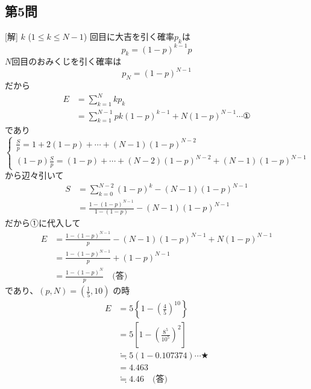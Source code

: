 \documentclass[../main.tex]{subfiles}
\begin{document}
\begin{center}
\end{center}

\subsection*{第5問}
[解] $k$ ($1 \le k \le N-1$) 回目に大吉を引く確率$p_k$は
\[ p_k = (1-p)^{k-1}p \]
$N$回目のおみくじを引く確率は
\[ p_N = (1-p)^{N-1} \]
だから
\begin{align*}
  E &= \sum_{k=1}^N k p_k \\
  &= \sum_{k=1}^{N-1} pk(1-p)^{k-1} + N(1-p)^{N-1} \cdots \text{①}
\end{align*}
であり
\[
  \begin{cases} \frac{S}{p} = 1 + 2(1-p) + \cdots + (N-1)(1-p)^{N-2} \\ (1-p)\frac{S}{p} = (1-p) + \cdots + (N-2)(1-p)^{N-2} + (N-1)(1-p)^{N-1}
\end{cases} \]
から辺々引いて
\begin{align*}
  S &= \sum_{k=0}^{N-2} (1-p)^k - (N-1)(1-p)^{N-1} \\
  &= \frac{1-(1-p)^{N-1}}{1-(1-p)} - (N-1)(1-p)^{N-1}
\end{align*}
だから①に代入して
\begin{align*}
  E &= \frac{1-(1-p)^{N-1}}{p} - (N-1)(1-p)^{N-1} + N(1-p)^{N-1} \\
  &= \frac{1-(1-p)^{N-1}}{p} + (1-p)^{N-1} \\
  &= \frac{1-(1-p)^N}{p} \quad \text{(答)}
\end{align*}
であり、$(p, N) = \left(\frac{1}{5}, 10\right)$ の時
\begin{align*}
  E &= 5 \left\{ 1 - \left(\frac{4}{5}\right)^{10} \right\} \\
  &= 5 \left[ 1 - \left(\frac{8^5}{10^5}\right)^2 \right] \\
  &\fallingdotseq 5 ( 1 - 0.107374 ) \cdots \bigstar \\
  &= 4.463 \\
  &\fallingdotseq 4.46 \quad \text{(答)}
\end{align*}
\end{document}
